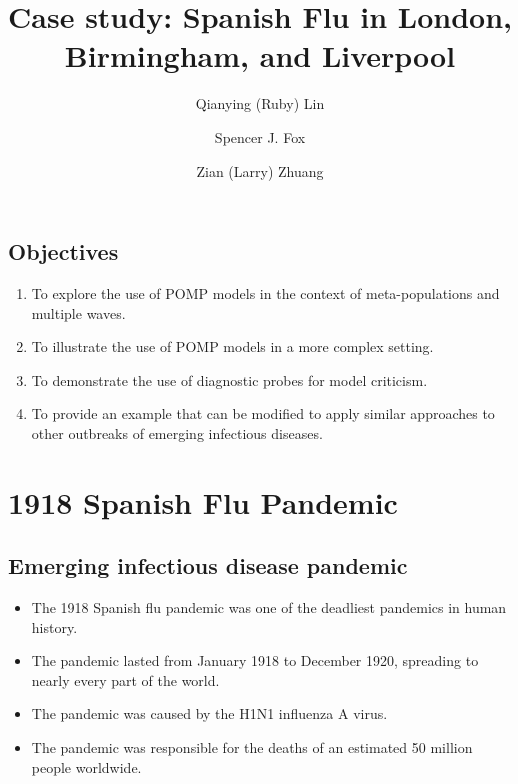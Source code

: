 \documentclass[
  letterpaper,
  DIV=11,
  numbers=noendperiod]{scrartcl}
\title{Case study: Spanish Flu in London, Birmingham, and Liverpool}
\author{Qianying (Ruby) Lin \and Spencer J. Fox \and Zian (Larry)
Zhuang}
\date{}
\providecommand{\tightlist}{%
  \setlength{\itemsep}{0pt}\setlength{\parskip}{0pt}}\usepackage{longtable,booktabs,array}
\begin{document}
\maketitle
\ifdefined\Shaded\renewenvironment{Shaded}{\begin{tcolorbox}[interior hidden, breakable, sharp corners, boxrule=0pt, borderline west={3pt}{0pt}{shadecolor}, frame hidden, enhanced]}{\end{tcolorbox}}\fi

\hypertarget{objectives}{%
\subsection{Objectives}\label{objectives}}

\begin{enumerate}
\def\labelenumi{\arabic{enumi}.}
\tightlist
\item
  To explore the use of POMP models in the context of meta-populations
  and multiple waves.
\item
  To illustrate the use of POMP models in a more complex setting.
\item
  To demonstrate the use of diagnostic probes for model criticism.
\item
  To provide an example that can be modified to apply similar approaches
  to other outbreaks of emerging infectious diseases.
\end{enumerate}

\vspace{2ex}

\hypertarget{spanish-flu-pandemic}{%
\section{1918 Spanish Flu Pandemic}\label{spanish-flu-pandemic}}

\hypertarget{emerging-infectious-disease-pandemic}{%
\subsection{Emerging infectious disease
pandemic}\label{emerging-infectious-disease-pandemic}}

\begin{itemize}
\tightlist
\item
  The 1918 Spanish flu pandemic was one of the deadliest pandemics in
  human history.
\item
  The pandemic lasted from January 1918 to December 1920, spreading to
  nearly every part of the world.
\item
  The pandemic was caused by the H1N1 influenza A virus.
\item
  The pandemic was responsible for the deaths of an estimated 50 million
  people worldwide.
\end{itemize}
\end{document}
